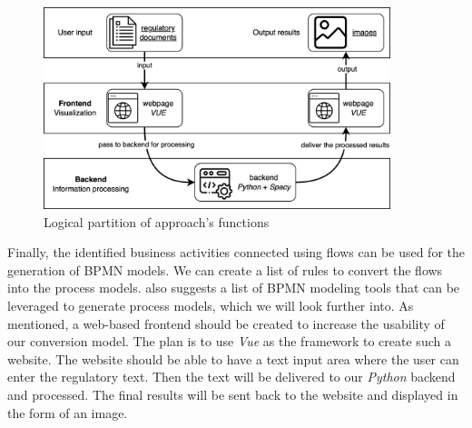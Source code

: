 \begin{figure}[h]
    \centering
    \caption{Logical partition of approach's functions}
    \includegraphics[width=0.9\textwidth]{tum-resources/images/Application_frontbackend.png}
\end{figure}

Finally, the identified business activities connected using flows can be used for the generation of BPMN models. We can create a list of rules to convert the flows into the process models. \cite{literature_review_1} also suggests a list of BPMN modeling tools that can be leveraged to generate process models, which we will look further into. As mentioned, a web-based frontend should be created to increase the usability of our conversion model. The plan is to use \textit{Vue} as the framework to create such a website. The website should be able to have a text input area where the user can enter the regulatory text. Then the text will be delivered to our \textit{Python} backend and processed. The final results will be sent back to the website and displayed in the form of an image. 


